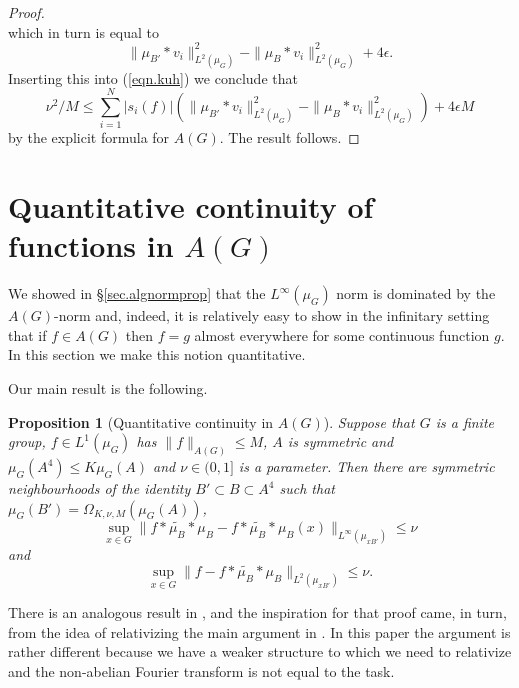 \documentclass[12pt]{amsart}
\numberwithin{equation}{section}
\theoremstyle{plain}
\newtheorem{proposition}[subsection]{Proposition}
\theoremstyle{definition}
\renewcommand{\leq}{\leqslant}
\begin{document}
\begin{proof}
\begin{equation*}
\end{equation*}
which in turn is equal to
\begin{equation*}
\|\mu_{B'} \ast v_i\|_{L^2(\mu_G)}^2-\|\mu_B\ast v_i\|_{L^2(\mu_G)}^2  +4\epsilon.
\end{equation*}
Inserting this into (\ref{eqn.kuh}) we conclude that
\begin{equation*}
\nu^2/M \leq \sum_{i=1}^N{|s_i(f)|(\|\mu_{B'} \ast v_i\|_{L^2(\mu_G)}^2-\|\mu_B\ast v_i\|_{L^2(\mu_G)}^2)} + 4\epsilon M
\end{equation*}
by the explicit formula for $A(G)$. The result follows.
\end{proof}

\section{Quantitative continuity of functions in $A(G)$}\label{sec.qc}

We showed in \S\ref{sec.algnormprop} that the $L^\infty(\mu_G)$ norm is dominated by the $A(G)$-norm and, indeed, it is relatively easy to show in the infinitary setting that if $f\in A(G)$ then $f=g$ almost everywhere for some continuous function $g$.  In this section we make this notion quantitative.  

Our main result is the following.
\begin{proposition}[{Quantitative continuity in $A(G)$}]\label{prop.quantcon}
Suppose that $G$ is a finite group, $f \in L^1(\mu_G)$ has $\|f\|_{A(G)} \leq M$, $A$ is symmetric and $\mu_G(A^4) \leq K\mu_G(A)$ and $\nu \in (0,1]$ is a parameter. Then there are symmetric neighbourhoods of the identity $B' \subset B \subset A^4$ such that $\mu_G(B')=\Omega_{K,\nu,M}(\mu_G(A))$,
\begin{equation*}
\sup_{x \in G}{\|f\ast\widetilde{\mu_B}\ast  \mu_B-f\ast\widetilde{\mu_B}\ast  \mu_B(x)\|_{L^\infty(\mu_{xB'})}}\leq \nu
\end{equation*}
and
\begin{equation*}
\sup_{x \in G}{\|f - f\ast\widetilde{\mu_B}\ast  \mu_B\|_{L^2(\mu_{xB'})}}\leq \nu.
\end{equation*}
\end{proposition}
There is an analogous result in \cite[Proposition 5.1]{BJGTS2}, and the inspiration for that proof came, in turn, from the idea of relativizing the main argument in \cite{BJGSVK}.  In this paper the argument is rather different because we have a weaker structure to which we need to relativize and the non-abelian Fourier transform is not equal to the task.  
\end{document}
